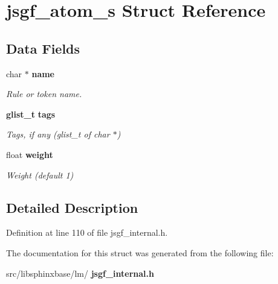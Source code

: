 \section{jsgf\+\_\+atom\+\_\+s Struct Reference}
\label{structjsgf__atom__s}
\subsection*{Data Fields}
\begin{DoxyCompactItemize}
\item 
\mbox{\label{structjsgf__atom__s_ac7473e48f49258c5e5ef65bbb669b19e}} 
char $\ast$ \textbf{ name}
\begin{DoxyCompactList}\small\item\em Rule or token name. \end{DoxyCompactList}\item 
\mbox{\label{structjsgf__atom__s_a4ecab128d84fd748efe52e338e7e2ecb}} 
\textbf{ glist\+\_\+t} \textbf{ tags}
\begin{DoxyCompactList}\small\item\em Tags, if any (glist\+\_\+t of char $\ast$) \end{DoxyCompactList}\item 
\mbox{\label{structjsgf__atom__s_a50672ba6d1e24c55bf8b58b97114effa}} 
float \textbf{ weight}
\begin{DoxyCompactList}\small\item\em Weight (default 1) \end{DoxyCompactList}\end{DoxyCompactItemize}


\subsection{Detailed Description}


Definition at line 110 of file jsgf\+\_\+internal.\+h.



The documentation for this struct was generated from the following file\+:\begin{DoxyCompactItemize}
\item 
src/libsphinxbase/lm/\textbf{ jsgf\+\_\+internal.\+h}\end{DoxyCompactItemize}
